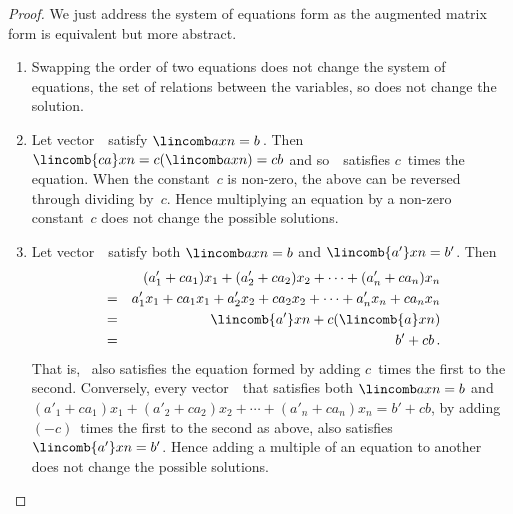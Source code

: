 \begin{comment}
Interestingly, some other texts omit a proof that row operations preserve the solution(s).  Poole comments on reversibility.  Larson comments that row operations produce `equivalent' systems, but does not prove.  Beezer proves it.
\end{comment}

\begin{proof} 
We just address the system of equations form as the augmented matrix form is equivalent but more abstract.
\begin{enumerate}
\item Swapping the order of two equations does not change the system of equations, the set of relations between the variables, so does not change the solution.
\item Let vector~\xv\ satisfy \(\lincomb axn=b\)\,.
Then \(\lincomb{ca}xn=c(\lincomb axn)=cb\) and so~\xv\ satisfies \(c\)~times the equation.
When the constant~\(c\) is non-zero, the above can be reversed through dividing by~\(c\).
Hence multiplying an equation by a non-zero constant~\(c\) does not change the possible solutions.
\item 
Let vector~\xv\ satisfy both \(\lincomb axn=b\) and \(\lincomb{a'}xn=b'\).
Then
\begin{eqnarray*}
&&(a'_1+ca_1)x_1+(a'_2+ca_2)x_2+\cdots+(a'_n+ca_n)x_n
\\&=&a'_1x_1+ca_1x_1+a'_2x_2+ca_2x_2+\cdots+a'_nx_n+ca_nx_n
\\&=&\lincomb{a'}xn +c(\lincomb{a}xn)
\\&=&b'+cb\,.
\end{eqnarray*}
That is, \xv~also satisfies the equation formed by adding \(c\)~times the first to the second.
Conversely, every vector~\xv\ that satisfies both \(\lincomb axn=b\) and \((a'_1+ca_1)x_1+(a'_2+ca_2)x_2+\cdots+(a'_n+ca_n)x_n=b'+cb\), by adding \((-c)\)~times the first to the second as above, also satisfies \(\lincomb{a'}xn=b'\).
Hence adding a multiple of an equation to another does not change the possible solutions.
\end{enumerate}
\end{proof}



